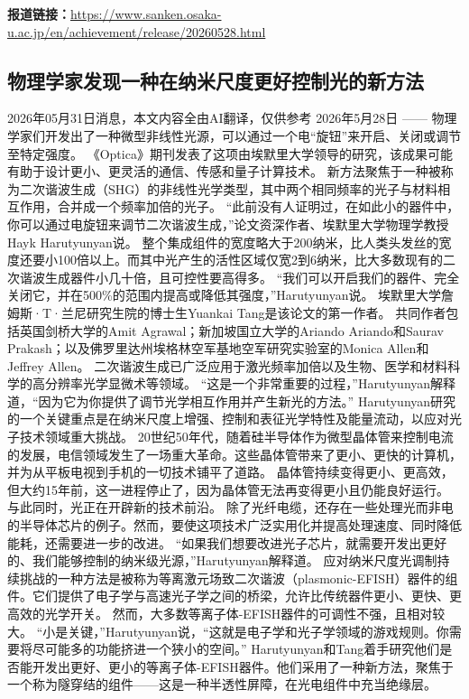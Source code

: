 \documentclass[12pt,a4paper]{ctexart}
\begin{document}
\noindent\textbf{报道链接：}\url{https://www.sanken.osaka-u.ac.jp/en/achievement/release/20260528.html}

\subsection{ 物理学家发现一种在纳米尺度更好控制光的新方法 }

2026年05月31日消息，本文内容全由AI翻译，仅供参考
2026年5月28日 —— 物理学家们开发出了一种微型非线性光源，可以通过一个电“旋钮”来开启、关闭或调节至特定强度。
《Optica》期刊发表了这项由埃默里大学领导的研究，该成果可能有助于设计更小、更灵活的通信、传感和量子计算技术。
新方法聚焦于一种被称为二次谐波生成（SHG）的非线性光学类型，其中两个相同频率的光子与材料相互作用，合并成一个频率加倍的光子。
“此前没有人证明过，在如此小的器件中，你可以通过电旋钮来调节二次谐波生成，”论文资深作者、埃默里大学物理学教授Hayk Harutyunyan说。
整个集成组件的宽度略大于200纳米，比人类头发丝的宽度还要小100倍以上。而其中光产生的活性区域仅宽2到6纳米，比大多数现有的二次谐波生成器件小几十倍，且可控性要高得多。
“我们可以开启我们的器件、完全关闭它，并在500\%的范围内提高或降低其强度，”Harutyunyan说。
埃默里大学詹姆斯·T·兰尼研究生院的博士生Yuankai Tang是该论文的第一作者。
共同作者包括英国剑桥大学的Amit Agrawal；新加坡国立大学的Ariando Ariando和Saurav Prakash；以及佛罗里达州埃格林空军基地空军研究实验室的Monica Allen和Jeffrey Allen。
二次谐波生成已广泛应用于激光频率加倍以及生物、医学和材料科学的高分辨率光学显微术等领域。
“这是一个非常重要的过程，”Harutyunyan解释道，“因为它为你提供了调节光学相互作用并产生新光的方法。”
Harutyunyan研究的一个关键重点是在纳米尺度上增强、控制和表征光学特性及能量流动，以应对光子技术领域重大挑战。
20世纪50年代，随着硅半导体作为微型晶体管来控制电流的发展，电信领域发生了一场重大革命。这些晶体管带来了更小、更快的计算机，并为从平板电视到手机的一切技术铺平了道路。
晶体管持续变得更小、更高效，但大约15年前，这一进程停止了，因为晶体管无法再变得更小且仍能良好运行。
与此同时，光正在开辟新的技术前沿。
除了光纤电缆，还存在一些处理光而非电的半导体芯片的例子。然而，要使这项技术广泛实用化并提高处理速度、同时降低能耗，还需要进一步的改进。
“如果我们想要改进光子芯片，就需要开发出更好的、我们能够控制的纳米级光源，”Harutyunyan解释道。
应对纳米尺度光调制持续挑战的一种方法是被称为等离激元场致二次谐波（plasmonic-EFISH）器件的组件。它们提供了电子学与高速光子学之间的桥梁，允许比传统器件更小、更快、更高效的光学开关。
然而，大多数等离子体-EFISH器件的可调性不强，且相对较大。
“小是关键，”Harutyunyan说，“这就是电子学和光子学领域的游戏规则。你需要将尽可能多的功能挤进一个狭小的空间。”
Harutyunyan和Tang着手研究他们是否能开发出更好、更小的等离子体-EFISH器件。他们采用了一种新方法，聚焦于一个称为隧穿结的组件——这是一种半透性屏障，在光电组件中充当绝缘层。
\end{document}
